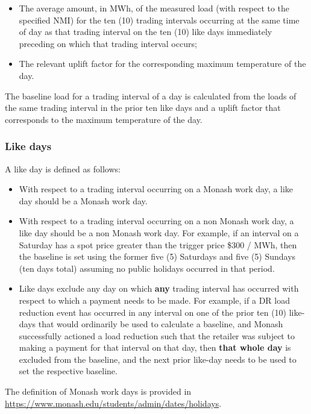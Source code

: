 \begin{itemize}
	\item The average amount, in MWh, of the measured load (with respect to the specified NMI) for the ten (10) trading intervals occurring at the same time of day as that trading interval on the ten (10) like days immediately preceding on which that trading interval occurs;
	
	\item The relevant uplift factor for the corresponding maximum temperature of the day. 
\end{itemize}


The baseline load for a trading interval of a day is calculated from the loads of the same trading interval in the prior ten like days and a uplift factor that corresponds to the maximum temperature of the day. 


\subsubsection{Like days}
\label{dr:like-days}

A like day is defined as follows:

\begin{itemize}
	\item With respect to a trading interval occurring on a Monash work day, a like day should be a Monash work day.
	
	\item With respect to a trading interval occurring on a non Monash work day, a like day should be a non Monash work day. For example, if an interval on a Saturday has a spot price greater than the trigger price \$300 / MWh, then the baseline is set using the former five (5) Saturdays and five (5) Sundays (ten days total) assuming no public holidays occurred in that period.
	
	\item Like days exclude any day on which \textbf{any} trading interval has occurred with respect to which a payment needs to be made. For example, if a \gls{DR} load reduction event has occurred in any interval on one of the prior ten (10) like-days that would ordinarily be used to calculate a baseline, and Monash successfully actioned a load reduction such that the retailer was subject to making a payment for that interval on that day, then \textbf{that whole day} is excluded from the baseline, and the next prior like-day needs to be used to set the respective baseline.
	
\end{itemize}
The definition of Monash work days is provided in \url{https://www.monash.edu/students/admin/dates/holidays}.

